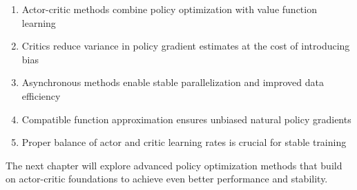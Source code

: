 \begin{keyideabox}
\begin{enumerate}
    \item Actor-critic methods combine policy optimization with value function learning
    \item Critics reduce variance in policy gradient estimates at the cost of introducing bias
    \item Asynchronous methods enable stable parallelization and improved data efficiency
    \item Compatible function approximation ensures unbiased natural policy gradients
    \item Proper balance of actor and critic learning rates is crucial for stable training
\end{enumerate}
\end{keyideabox}

The next chapter will explore advanced policy optimization methods that build on actor-critic foundations to achieve even better performance and stability.